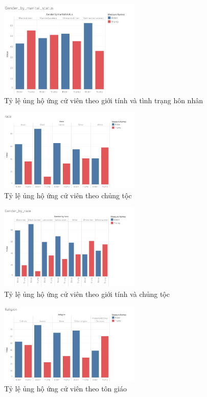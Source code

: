 \documentclass[14pt, a4paper]{article}
\numberwithin{equation}{section}
\numberwithin{figure}{section}
\numberwithin{dl}{section}
\numberwithin{md}{section}
\numberwithin{bd}{section}
\numberwithin{dn}{section}
\numberwithin{hq}{section}
\begin{document}
    \begin{figure}[h!]
        \centering
        \includegraphics[width=0.6\textwidth]{figures/Gender_by_marital_status.png}
        \caption{Tỷ lệ ủng hộ ứng cử viên theo giới tính và tình trạng hôn nhân}
    \end{figure}

    \begin{figure}[h!]
        \centering
        \includegraphics[width=0.6\textwidth]{figures/race.png}
        \caption{Tỷ lệ ủng hộ ứng cử viên theo chủng tộc}
    \end{figure}

    \begin{figure}[h!]
        \centering
        \includegraphics[width=0.6\textwidth]{figures/Gender_by_race.png}
        \caption{Tỷ lệ ủng hộ ứng cử viên theo giới tính và chủng tộc}
    \end{figure}

    \begin{figure}[h!]
        \centering
        \includegraphics[width=0.6\textwidth]{figures/Religion.png}
        \caption{Tỷ lệ ủng hộ ứng cử viên theo tôn giáo}
    \end{figure}
\end{document}

